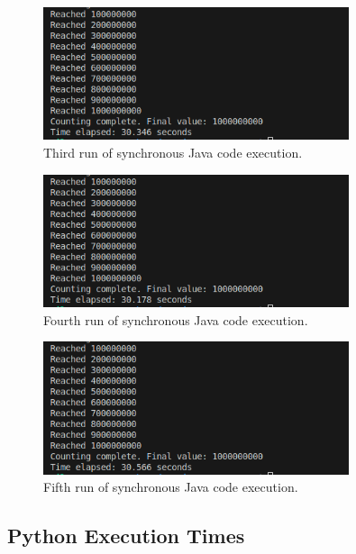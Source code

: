 \documentclass{article}
\begin{document}
\begin{figure}[htbp]
    \centering
    \includegraphics[width=0.8\textwidth]{../records/results_java/result_3.png}
    \caption{Third run of synchronous Java code execution.}
    \label{fig:Java-runtime-3}
\end{figure}

\begin{figure}[htbp]
    \centering
    \includegraphics[width=0.8\textwidth]{../records/results_java/result_4.png}
    \caption{Fourth run of synchronous Java code execution.}
    \label{fig:Java-runtime-4}
\end{figure}

\begin{figure}[htbp]
    \centering
    \includegraphics[width=0.8\textwidth]{../records/results_java/result_5.png}
    \caption{Fifth run of synchronous Java code execution.}
    \label{fig:Java-runtime-5}
\end{figure}

\clearpage
\subsection{Python Execution Times} 
\end{document}
